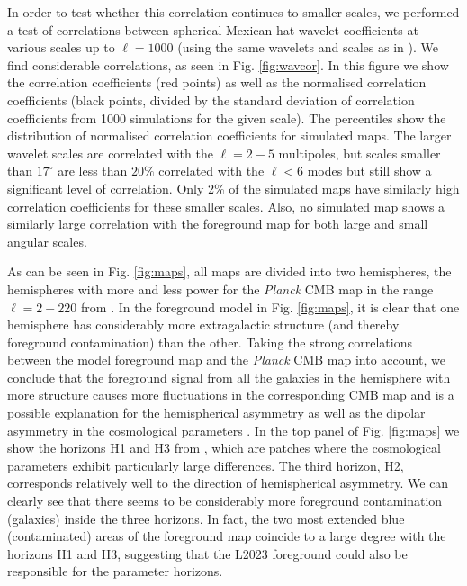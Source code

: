 \documentclass{aa}
\begin{document}
In order to test whether this correlation continues to smaller scales, we performed a test of correlations between spherical Mexican hat wavelet coefficients at various scales up to $\ell=1000$ (using the same wavelets and scales as in \citealt{vielva}). We find considerable correlations, as seen in Fig. \ref{fig:wavcor}. In this figure we show the correlation coefficients (red points) as well as the normalised correlation coefficients (black points, divided by the standard deviation of correlation coefficients from 1000 simulations for the given scale). The percentiles show the distribution of normalised correlation coefficients for simulated maps. The larger wavelet scales are correlated with the $\ell=2-5$ multipoles, but scales smaller than $17^\circ$ are less than $20\%$ correlated with the $\ell<6$ modes but still show a significant level of correlation. Only 2\% of the simulated maps have similarly high correlation coefficients for these smaller scales. Also, no simulated map shows a similarly large correlation with the foreground map for both large and small angular scales.

As can be seen in Fig. \ref{fig:maps}, all maps are divided into two hemispheres, the hemispheres with more and less power for the \textit{Planck} CMB map in the range $\ell=2-220$ from \citet{iands2018}. In the foreground model in Fig. \ref{fig:maps}, it  is clear that one hemisphere has considerably more extragalactic structure (and thereby foreground contamination) than the other. Taking the strong correlations between the model foreground map and the \textit{Planck} CMB map into account, we conclude that the foreground signal from all the galaxies in the hemisphere with more structure causes more fluctuations in the corresponding CMB map and is a possible explanation for the hemispherical asymmetry as well as the dipolar asymmetry in the cosmological parameters \citep{paramdipole}. In the top panel of Fig. \ref{fig:maps} we show the horizons H1 and H3 from \citet{paramhorizons}, which are patches where the cosmological parameters exhibit particularly large differences. The third horizon, H2, corresponds relatively well to the direction of hemispherical asymmetry. We can clearly see that there seems to be considerably more foreground contamination (galaxies) inside the three horizons. In fact, the two most extended blue (contaminated) areas of the foreground map coincide to a large degree with the horizons H1 and H3, suggesting that the L2023 foreground could also be responsible for the parameter horizons.
\end{document}
